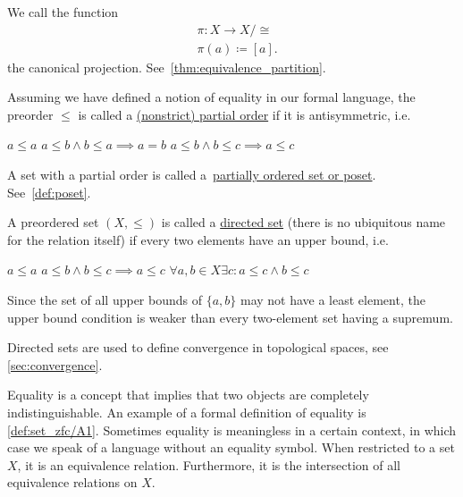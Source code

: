 \begin{definition}
\begin{defenum}
    We call the function
    \begin{align*}
      &\pi: X \to X / \cong \\
      &\pi(a) \coloneqq [a].
    \end{align*}
    the canonical projection. See~\cref{thm:equivalence_partition}.

    \item\label{def:order/partial} Assuming we have defined a notion of equality in our formal language, the preorder $\leq$ is called a \ul{(nonstrict) partial order} if it is antisymmetric, i.e.
    \begin{description}
       $a \leq a$
       $a \leq b \land b \leq a \implies a = b$
       $a \leq b \land b \leq c \implies a \leq c$
    \end{description}

    A set with a partial order is called a~\ul{partially ordered set or poset}. See~\cref{def:poset}.

    \item\label{def:order/directed} A preordered set $(X, \leq)$ is called a \ul{directed set} (there is no ubiquitous name for the relation itself) if every two elements have an upper bound, i.e.
    \begin{description}
       $a \leq a$
       $a \leq b \land b \leq c \implies a \leq c$
       $\forall a, b \in X \exists c: a \leq c \land b \leq c$
    \end{description}

    Since the set of all upper bounds of $\{ a, b \}$ may not have a least element, the upper bound condition is weaker than every two-element set having a supremum.

    Directed sets are used to define convergence in topological spaces, see \cref{sec:convergence}.
  \end{defenum}
\end{definition}

\begin{note}\label{note:equality_equivalence_relation}
  Equality is a concept that implies that two objects are completely indistinguishable. An example of a formal definition of equality is \cref{def:set_zfc/A1}. Sometimes equality is meaningless in a certain context, in which case we speak of a language without an equality symbol. When restricted to a set $X$, it is an equivalence relation. Furthermore, it is the intersection of all equivalence relations on $X$.
\end{note}

